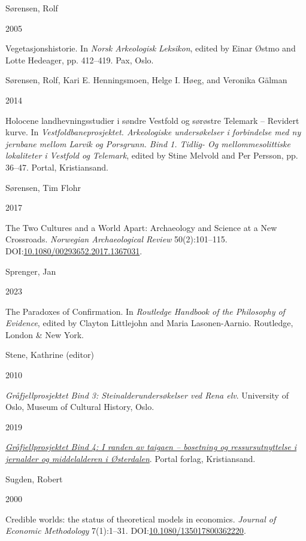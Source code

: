 \documentclass[
  a4paper,
  oneside]{uiophdthesis}
\newlength{\cslhangindent}
\newlength{\csllabelwidth}
\newlength{\cslentryspacingunit} %
\newenvironment{CSLReferences}[2] %
 {%
  \setlength{\parindent}{0pt}
  \ifodd #1
  \let\oldpar\par
  \def\par{\hangindent=\cslhangindent\oldpar}
  \fi
  \setlength{\parskip}{#2\cslentryspacingunit}
 }%
 {}
\newcommand{\CSLBlock}[1]{#1\hfill\break}
\newcommand{\CSLLeftMargin}[1]{\parbox[t]{\csllabelwidth}{#1}}
\newcommand{\CSLRightInline}[1]{\parbox[t]{\linewidth - \csllabelwidth}{#1}\break}
\begin{document}
\begin{CSLReferences}{0}{0}
\leavevmode{}%
\CSLBlock{Sørensen, Rolf}
\CSLLeftMargin{ 2005}
\CSLRightInline{{Vegetasjonshistorie}. In \emph{{Norsk Arkeologisk Leksikon}}, edited by Einar Østmo and Lotte Hedeager, pp. 412--419. Pax, Oslo.}

\leavevmode{}%
\CSLBlock{Sørensen, Rolf, Kari E. Henningsmoen, Helge I. Høeg, and Veronika Gälman}
\CSLLeftMargin{ 2014}
\CSLRightInline{{Holocene landhevningsstudier i søndre Vestfold og sørøstre Telemark -- Revidert kurve}. In \emph{{Vestfoldbaneprosjektet. Arkeologiske undersøkelser i forbindelse med ny jernbane mellom Larvik og Porsgrunn. Bind 1. Tidlig- Og mellommesolittiske lokaliteter i Vestfold og Telemark}}, edited by Stine Melvold and Per Persson, pp. 36--47. Portal, Kristiansand.}

\leavevmode{}%
\CSLBlock{Sørensen, Tim Flohr}
\CSLLeftMargin{ 2017}
\CSLRightInline{{The Two Cultures and a World Apart: Archaeology and Science at a New Crossroads}. \emph{Norwegian Archaeological Review} 50(2):101--115. DOI:\href{https://doi.org/10.1080/00293652.2017.1367031}{10.1080/00293652.2017.1367031}.}

\leavevmode{}%
\CSLBlock{Sprenger, Jan}
\CSLLeftMargin{ 2023}
\CSLRightInline{{The Paradoxes of Confirmation}. In \emph{{Routledge Handbook of the Philosophy of Evidence}}, edited by Clayton Littlejohn and Maria Lasonen-Aarnio. Routledge, London \& New York.}

\leavevmode{}%
\CSLBlock{Stene, Kathrine (editor)}
\CSLLeftMargin{ 2010}
\CSLRightInline{\emph{{Gråfjellprosjektet Bind 3: Steinalderundersøkelser ved Rena elv}}. University of Oslo, Museum of Cultural History, Oslo.}

\leavevmode{}%
\CSLLeftMargin{ 2019 }
\CSLRightInline{\emph{\href{https://doi.org/10.23865/noasp.54}{{Gråfjellprosjektet Bind 4: I randen av taigaen -- bosetning og ressursutnyttelse i jernalder og middelalderen i Østerdalen}}}. Portal forlag, Kristiansand.}

\leavevmode{}%
\CSLBlock{Sugden, Robert}
\CSLLeftMargin{ 2000}
\CSLRightInline{{Credible worlds: the status of theoretical models in economics}. \emph{Journal of Economic Methodology} 7(1):1--31. DOI:\href{https://doi.org/10.1080/135017800362220}{10.1080/135017800362220}.}


\end{CSLReferences}
\end{document}
